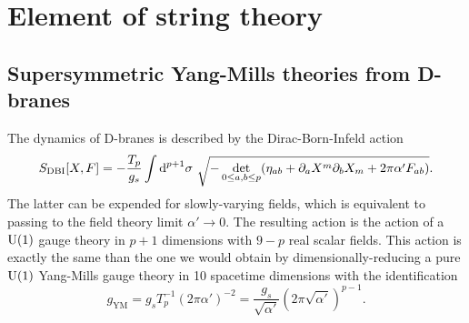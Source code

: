 \section{Element of string theory}

    \subsection{Supersymmetric Yang-Mills theories from D-branes}

        The dynamics of D-branes is described by the Dirac-Born-Infeld action
        \begin{equation}
            S_{\text{DBI}}[X,F] = -\frac{T_p}{g_s}\int\text{d}^{p+1}\sigma~\sqrt{-\det\limits_{0\leq a,b\leq p}(\eta_{ab}+\partial_a X^m\partial_b X_m+2\pi\alpha'F_{ab})}.
        \end{equation}
        The latter can be expended for slowly-varying ﬁelds, which is equivalent to passing to the ﬁeld theory limit $\alpha'\to0$. The resulting action is the action of a $\text{U}(1)$ gauge theory in $p+1$ dimensions with $9-p$ real scalar fields. This action is exactly the same than the one we would obtain by dimensionally-reducing a pure $\text{U}(1)$ Yang-Mills gauge theory in 10 spacetime dimensions with the identification
        \begin{equation}
            g_{\text{YM}}=g_sT^{-1}_p(2\pi\alpha')^{-2}=\frac{g_s}{\sqrt{\alpha'}}(2\pi\sqrt{\alpha'})^{p-1}.
        \end{equation}


